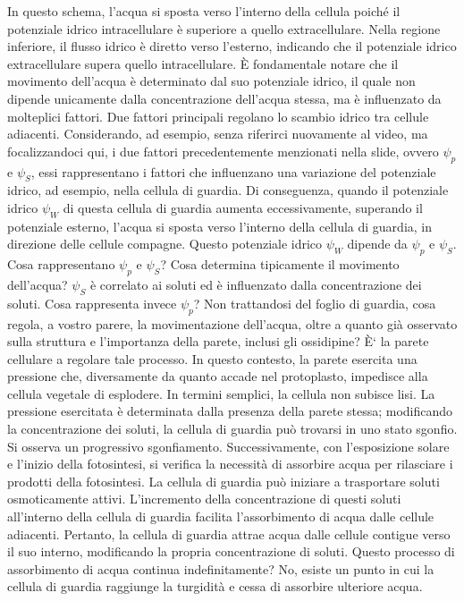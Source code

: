 \documentclass[11pt, a4paper]{article}
\begin{document}
\begin{spacing}{1}
In questo schema, l'acqua si sposta verso l'interno della cellula poiché il potenziale idrico intracellulare è superiore a quello extracellulare. Nella regione inferiore, il flusso idrico è diretto verso l'esterno, indicando che il potenziale idrico extracellulare supera quello intracellulare. È fondamentale notare che il movimento dell'acqua è determinato dal suo potenziale idrico, il quale non dipende unicamente dalla concentrazione dell'acqua stessa, ma è influenzato da molteplici fattori. Due fattori principali regolano lo scambio idrico tra cellule adiacenti.
Considerando, ad esempio, senza riferirci nuovamente al video, ma focalizzandoci qui, i due fattori precedentemente menzionati nella slide, ovvero $\psi_p$ e $\psi_S$, essi rappresentano i fattori che influenzano una variazione del potenziale idrico, ad esempio, nella cellula di guardia. Di conseguenza, quando il potenziale idrico $\psi_W$ di questa cellula di guardia aumenta eccessivamente, superando il potenziale esterno, l'acqua si sposta verso l'interno della cellula di guardia, in direzione delle cellule compagne. Questo potenziale idrico $\psi_W$ dipende da $\psi_p$ e $\psi_S$. Cosa rappresentano $\psi_p$ e $\psi_S$? Cosa determina tipicamente il movimento dell'acqua? $\psi_S$ è correlato ai soluti ed è influenzato dalla concentrazione dei soluti. Cosa rappresenta invece $\psi_p$?
Non trattandosi del foglio di guardia, cosa regola, a vostro parere, la movimentazione dell'acqua, oltre a quanto gi\`a osservato sulla struttura e l'importanza della parete, inclusi gli ossidipine? \`E` la parete cellulare a regolare tale processo. In questo contesto, la parete esercita una pressione che, diversamente da quanto accade nel protoplasto, impedisce alla cellula vegetale di esplodere. In termini semplici, la cellula non subisce lisi. La pressione esercitata \`e determinata dalla presenza della parete stessa; modificando la concentrazione dei soluti, la cellula di guardia pu\`o trovarsi in uno stato sgonfio.
Si osserva un progressivo sgonfiamento. Successivamente, con l'esposizione solare e l'inizio della fotosintesi, si verifica la necessità di assorbire acqua per rilasciare i prodotti della fotosintesi. La cellula di guardia può iniziare a trasportare soluti osmoticamente attivi. L'incremento della concentrazione di questi soluti all'interno della cellula di guardia facilita l'assorbimento di acqua dalle cellule adiacenti. Pertanto, la cellula di guardia attrae acqua dalle cellule contigue verso il suo interno, modificando la propria concentrazione di soluti. Questo processo di assorbimento di acqua continua indefinitamente? No, esiste un punto in cui la cellula di guardia raggiunge la turgidità e cessa di assorbire ulteriore acqua.

\end{spacing}
\end{document}

